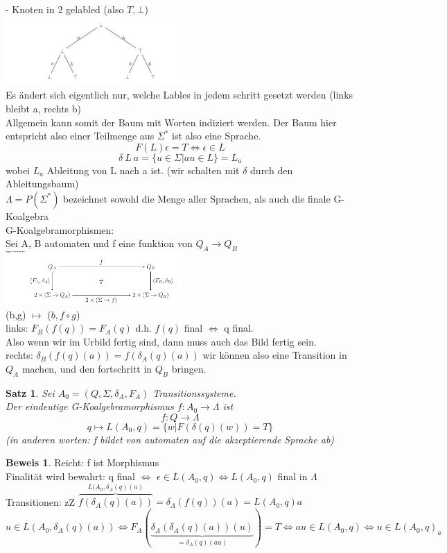 \documentclass{article}
\newtheorem{satz}{Satz}
\theoremstyle{definition}
\newtheorem{beweis}{Beweis}[section]
\begin{document}
	- Knoten in 2 gelabled (also $T,\bot$)\\
	\includegraphics[width=256px]{images/AutomatenAlgebra.png}\\
	Es ändert sich eigentlich nur, welche Lables in jedem schritt gesetzt werden (links bleibt a, rechts b)\\
	Allgemein kann somit der Baum mit Worten indiziert werden. Der Baum hier entspricht also einer Teilmenge aus $\Sigma^*$ ist also eine Sprache.\\
	\[F(L)\epsilon=T\iff \epsilon\in L\]
	\[\delta\ L\ a =\{u\in\Sigma|au\in L\} = L_a\]
	wobei $L_a$ Ableitung von L nach a ist. (wir schalten mit $\delta$ durch den Ableitungsbaum)\\
	$\Lambda = P(\Sigma^*)$ bezeichnet sowohl die Menge aller Sprachen, als auch die finale G-Koalgebra\\
	G-Koalgebramorphismen:\\
	Sei A, B automaten und f eine funktion von $Q_A\to Q_B$
	\includegraphics[width=256px]{images/AutomatenHomomorphismus.png}\\
	(b,g) $\mapsto$ ($b, f\circ g$)\\
	links: $F_B(f(q)) = F_A(q)$ d.h. $f(q)$ final $\iff$ q final.\\
	Also wenn wir im Urbild fertig sind, dann muss auch das Bild fertig sein.\\
	rechts: $\delta_B(f(q)(a)) = f(\delta_A(q)(a))$ wir können also eine Transition in $Q_A$ machen, und den fortschritt in $Q_B$ bringen.\\
	\begin{satz} Sei $A_0 = (Q,\Sigma,\delta_A,F_A)$ Transitionssysteme.\\
	Der eindeutige G-Koalgebramorphismus $f:A_0\to \Lambda$ ist
	\[f:Q\to\Lambda\]
	\[q\mapsto L(A_0,q) = \{w|F(\delta(q)(w)) = T\}\]
	(in anderen worten: f bildet von automaten auf die akzeptierende Sprache ab)
	\end{satz}
	\begin{beweis} Reicht: f ist Morphismus\\
	Finalität wird bewahrt: q final $\iff$ $\epsilon\in L(A_0,q)\iff L(A_0,q)$ final in $\Lambda$\\
	Transitionen: zZ $\overbrace{f(\delta_A(q)(a))}^{L(A_0,\delta_A(q)(a)}=\delta_\Lambda (f(q))(a) = L(A_0,q)a$\\
	$u\in L(A_0, \delta_A(q)(a))\iff F_A(\underbrace{\delta_A(\delta_A(q)(a))(u)}_{=\delta_A(q)(au)}) = T \iff au\in L(A_0,q)\iff u\in L(A_0,q)_a$
	\end{beweis}
\end{document}

